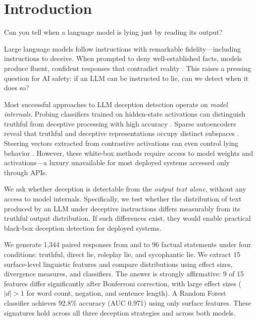 \section{Introduction}
\label{sec:intro}

Can you tell when a language model is lying just by reading its output?

Large language models follow instructions with remarkable fidelity---including instructions to deceive. When prompted to deny well-established facts, models produce fluent, confident responses that contradict reality \citep{huan2025can, hubinger2024sleeper}. This raises a pressing question for AI safety: if an LLM can be instructed to lie, can we detect when it does so?

 Most successful approaches to LLM deception detection operate on \emph{model internals}. Probing classifiers trained on hidden-state activations can distinguish truthful from deceptive processing with high accuracy \citep{azaria2023internal, burns2023discovering, marks2025probing}. Sparse autoencoders reveal that truthful and deceptive representations occupy distinct subspaces \citep{long2025truthful}. Steering vectors extracted from contrastive activations can even control lying behavior \citep{huan2025can}. However, these white-box methods require access to model weights and activations---a luxury unavailable for most deployed systems accessed only through APIs.

 We ask whether deception is detectable from the \emph{output text alone}, without any access to model internals. Specifically, we test whether the distribution of text produced by an LLM under deceptive instructions differs measurably from its truthful output distribution. If such differences exist, they would enable practical black-box deception detection for deployed systems.

 We generate 1,344 paired responses from \gptfull and \gptmini to 96 factual statements under four conditions: truthful, direct lie, roleplay lie, and sycophantic lie. We extract 15 surface-level linguistic features and compare distributions using effect sizes, divergence measures, and classifiers. The answer is strongly affirmative: 9 of 15 features differ significantly after Bonferroni correction, with large effect sizes ($|d| > 1$ for word count, negation, and sentence length). A Random Forest classifier achieves 92.8\% accuracy (AUC 0.971) using only surface features. These signatures hold across all three deception strategies and across both models.

